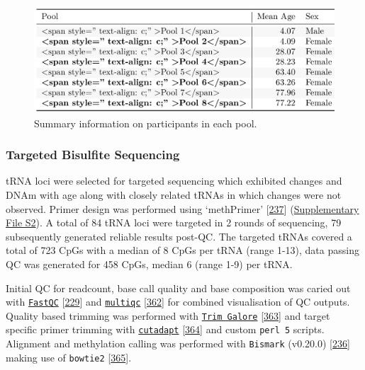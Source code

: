 \documentclass[
]{book}
\begin{document}
\begin{figure}

{\centering \includegraphics[width=1\linewidth]{figs/poolSummaryTable} 

}

\caption{Summary information on participants in each pool.}\label{fig:poolSummaryTable}
\end{figure}



\hypertarget{targetedBiSseq}{%
\subsubsection{Targeted Bisulfite Sequencing}\label{targetedBiSseq}}

tRNA loci were selected for targeted sequencing which exhibited changes and DNAm with age along with closely related tRNAs in which changes were not observed.
Primer design was performed using `methPrimer' {[}\protect\hyperlink{ref-Li2002}{237}{]} (\href{Supplementary_Files/Targeted_BiS-seq_Primers.txt}{Supplementary File S2}).
A total of 84 tRNA loci were targeted in 2 rounds of sequencing, 79 subsequently generated reliable results post-QC.
The targeted tRNAs covered a total of 723 CpGs with a median of 8 CpGs per tRNA (range 1-13), data passing QC was generated for 458 CpGs, median 6 (range 1-9) per tRNA.

Initial QC for readcount, base call quality and base composition was caried out with \href{https://github.com/s-andrews/FastQC}{\texttt{FastQC}} {[}\protect\hyperlink{ref-Andrews2010}{229}{]} and \href{https://github.com/ewels/MultiQC}{\texttt{multiqc}} {[}\protect\hyperlink{ref-Ewels2016}{362}{]} for combined visualisation of QC outputs.
Quality based trimming was performed with \href{https://github.com/FelixKrueger/TrimGalore}{\texttt{Trim\ Galore}} {[}\protect\hyperlink{ref-Krueger2015}{363}{]} and target specific primer trimming with \href{https://github.com/marcelm/cutadapt}{\texttt{cutadapt}} {[}\protect\hyperlink{ref-Martin2011}{364}{]} and custom \texttt{perl\ 5} scripts.
Alignment and methylation calling was performed with \texttt{Bismark} (v0.20.0) {[}\protect\hyperlink{ref-Krueger2011}{236}{]} making use of \texttt{bowtie2} {[}\protect\hyperlink{ref-Langmead2012}{365}{]}.
\end{document}
